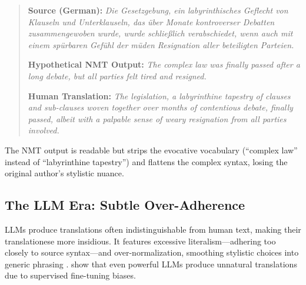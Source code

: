 \documentclass[11pt,a4paper]{article}
\begin{document}
\begin{quote}
\textbf{Source (German):} \textit{Die Gesetzgebung, ein labyrinthisches Geflecht von Klauseln und Unterklauseln, das über Monate kontroverser Debatten zusammengewoben wurde, wurde schließlich verabschiedet, wenn auch mit einem spürbaren Gefühl der müden Resignation aller beteiligten Parteien.}

\textbf{Hypothetical NMT Output:} \textit{The complex law was finally passed after a long debate, but all parties felt tired and resigned.}

\textbf{Human Translation:} \textit{The legislation, a labyrinthine tapestry of clauses and sub-clauses woven together over months of contentious debate, finally passed, albeit with a palpable sense of weary resignation from all parties involved.}
\end{quote}

The NMT output is readable but strips the evocative vocabulary (``complex law'' instead of ``labyrinthine tapestry'') and flattens the complex syntax, losing the original author's stylistic nuance.

\subsection{The LLM Era: Subtle Over-Adherence}

LLMs produce translations often indistinguishable from human text, making their translationese more insidious. It features excessive literalism---adhering too closely to source syntax---and over-normalization, smoothing stylistic choices into generic phrasing \cite{wang2024benchmarking}. \citet{li2025lost} show that even powerful LLMs produce unnatural translations due to supervised fine-tuning biases.
\end{document}
